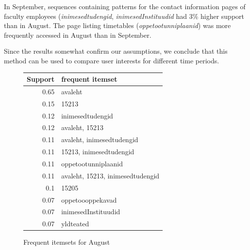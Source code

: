 \documentclass[12pt, english,a4paper]{article}
\begin{document}
In September, sequences containing patterns for the contact information pages of faculty employees (\emph{inimesedtudengid}, \emph{inimesedInstituudid} had 3\% higher support than in August. The page listing timetables (\emph{oppetootunniplaanid}) was more frequently accessed in August than in September.

Since the results somewhat confirm our assumptions, we conclude that this method can be used to compare user interests for different time periods.


\begin{figure}[H]
  \centering
\begin{tabular}{ r | l }
Support & frequent itemset \\ \hline
0.65 & avaleht \\ \hline
0.15 & 15213 \\ \hline
0.12 & inimesedtudengid \\ \hline
0.12 & avaleht, 15213 \\ \hline
0.11 & avaleht, inimesedtudengid \\ \hline
0.11 & 15213, inimesedtudengid \\ \hline
0.11 & oppetootunniplaanid \\ \hline
0.11 & avaleht, 15213, inimesedtudengid \\ \hline
0.1 & 15205 \\ \hline
0.07 & oppetoooppekavad \\ \hline
0.07 & inimesedInstituudid \\ \hline
0.07 & yldteated \\ \hline
\end{tabular}
  \caption{Frequent itemsets for August }
  \label{aug2}
\end{figure}
\end{document}
